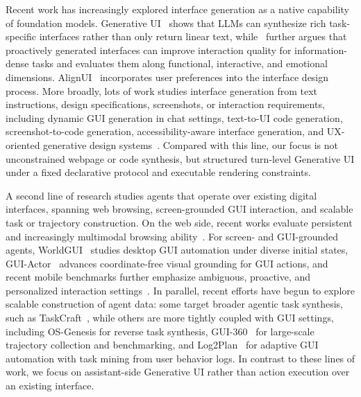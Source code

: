 \documentclass{llmxive}
\begin{document}
Recent work has increasingly explored interface generation as a native capability of foundation models. Generative UI~\citep{leviathan2025generative} shows that LLMs can synthesize rich task-specific interfaces rather than only return linear text, while~\citet{chen2025generative} further argues that proactively generated interfaces can improve interaction quality for information-dense tasks and evaluates them along functional, interactive, and emotional dimensions. AlignUI~\citep{liu2026alignui} incorporates user preferences into the interface design process. More broadly, lots of work studies interface generation from text instructions, design specifications, screenshots, or interaction requirements, including dynamic GUI generation in chat settings, text-to-UI code generation, screenshot-to-code generation, accessibility-aware interface generation, and UX-oriented generative design systems~\citep{wu2024uicoder, si2025design2code, yoon2025a11yn, chen2025genui}. Compared with this line, our focus is not unconstrained webpage or code synthesis, but structured turn-level Generative UI under a fixed declarative protocol and executable rendering constraints.

A second line of research studies agents that operate over existing digital interfaces, spanning web browsing, screen-grounded GUI interaction, and scalable task or trajectory construction. On the web side, recent works evaluate persistent and increasingly multimodal browsing ability~\citep{zhang2026browsecomp, li2025mm}. For screen- and GUI-grounded agents, WorldGUI~\citep{zhao2025worldgui} studies desktop GUI automation under diverse initial states, GUI-Actor~\cite{wu2025gui} advances coordinate-free visual grounding for GUI actions, and recent mobile benchmarks further emphasize ambiguous, proactive, and personalized interaction settings~\citep{sun2026ambibench, yang2025fingertip}. In parallel, recent efforts have begun to explore scalable construction of agent data: some target broader agentic task synthesis, such as TaskCraft~\citep{shi2025taskcraft}, while others are more tightly coupled with GUI settings, including OS-Genesis for reverse task synthesis, GUI-360~\citep{mu2025gui} for large-scale trajectory collection and benchmarking, and Log2Plan~\citep{lee2025log2plan} for adaptive GUI automation with task mining from user behavior logs. In contrast to these lines of work, we focus on assistant-side Generative UI rather than action execution over an existing interface.


\end{document}

